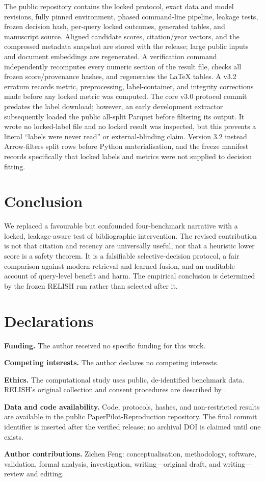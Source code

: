 \documentclass[11pt]{article}
\begin{document}
The public repository contains the locked protocol, exact data and model revisions,
fully pinned environment, phased command-line pipeline, leakage tests, frozen
decision hash, per-query locked outcomes, generated tables, and manuscript source.
Aligned candidate scores, citation/year vectors, and the compressed metadata snapshot
are stored with the release; large public inputs and document embeddings are regenerated.
A
verification command independently recomputes every numeric section of the result file,
checks all frozen score/provenance hashes, and regenerates the LaTeX tables.  A v3.2
erratum records metric, preprocessing, label-container, and integrity corrections made
before any locked metric was computed.  The core v3.0 protocol commit predates the
label download; however, an early development extractor subsequently loaded the public
all-split Parquet before filtering its output.  It wrote no locked-label file and no
locked result was inspected, but this prevents a literal ``labels were never read'' or
external-blinding claim.  Version 3.2 instead Arrow-filters split rows before Python
materialisation, and the freeze manifest records specifically that locked labels and
metrics were not supplied to decision fitting.

\section{Conclusion}

We replaced a favourable but confounded four-benchmark narrative with a locked,
leakage-aware test of bibliographic intervention.  The revised contribution is not
that citation and recency are universally useful, nor that a heuristic lower score is
a safety theorem.  It is a falsifiable selective-decision protocol, a fair comparison
against modern retrieval and learned fusion, and an auditable account of query-level
benefit and harm.  The empirical conclusion is determined by the frozen RELISH run
rather than selected after it.

\section*{Declarations}

\textbf{Funding.} The author received no specific funding for this work.

\textbf{Competing interests.} The author declares no competing interests.

\textbf{Ethics.} The computational study uses public, de-identified benchmark data.
RELISH's original collection and consent procedures are described by
\citet{brown2019relish}.

\textbf{Data and code availability.} Code, protocols, hashes, and non-restricted
results are available in the public PaperPilot-Reproduction repository.  The final
commit identifier is inserted after the verified release; no archival DOI is claimed
until one exists.

\textbf{Author contributions.} Zichen Feng: conceptualisation, methodology, software,
validation, formal analysis, investigation, writing---original draft, and
writing---review and editing.



\end{document}

